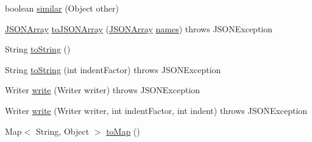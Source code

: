 \begin{DoxyCompactItemize}
\item 
boolean \hyperlink{classorg_1_1json_1_1JSONObject_aafd339041f6c72c195769e4cd4ef6daf}{similar} (Object other)
\item 
\hyperlink{classorg_1_1json_1_1JSONArray}{J\-S\-O\-N\-Array} \hyperlink{classorg_1_1json_1_1JSONObject_acafa0ef1407022894738177b3195e9f3}{to\-J\-S\-O\-N\-Array} (\hyperlink{classorg_1_1json_1_1JSONArray}{J\-S\-O\-N\-Array} \hyperlink{classorg_1_1json_1_1JSONObject_a02e83de70e290231527d1760c4dd30fc}{names})  throws J\-S\-O\-N\-Exception 
\item 
String \hyperlink{classorg_1_1json_1_1JSONObject_a7f8cab6eb354ceb416a421574b4be424}{to\-String} ()
\item 
String \hyperlink{classorg_1_1json_1_1JSONObject_a56087516560b91c8aebbba67efda1a61}{to\-String} (int indent\-Factor)  throws J\-S\-O\-N\-Exception 
\item 
Writer \hyperlink{classorg_1_1json_1_1JSONObject_ac810606f683376f15962ed9b32db9eba}{write} (Writer writer)  throws J\-S\-O\-N\-Exception 
\item 
Writer \hyperlink{classorg_1_1json_1_1JSONObject_afccc699dd9731cbee68c4e3efa8f45c8}{write} (Writer writer, int indent\-Factor, int indent)  throws J\-S\-O\-N\-Exception 
\item 
Map$<$ String, Object $>$ \hyperlink{classorg_1_1json_1_1JSONObject_a681b6f283f7155f4e7f8c6519fea3ae5}{to\-Map} ()
\end{DoxyCompactItemize}
